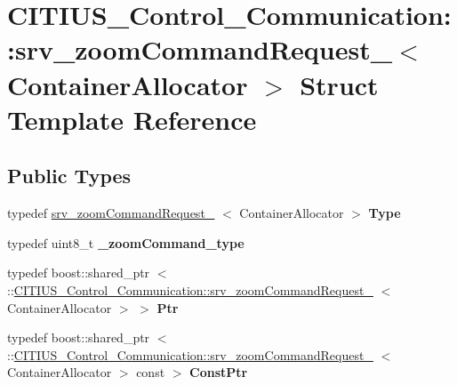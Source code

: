 \hypertarget{struct_c_i_t_i_u_s___control___communication_1_1srv__zoom_command_request__}{\section{\-C\-I\-T\-I\-U\-S\-\_\-\-Control\-\_\-\-Communication\-:\-:srv\-\_\-zoom\-Command\-Request\-\_\-$<$ \-Container\-Allocator $>$ \-Struct \-Template \-Reference}
\label{struct_c_i_t_i_u_s___control___communication_1_1srv__zoom_command_request__}
}
\subsection*{\-Public \-Types}
\begin{DoxyCompactItemize}
\item 
\hypertarget{struct_c_i_t_i_u_s___control___communication_1_1srv__zoom_command_request___a566a130cc023cd323ae48b9c8cd036e5}{typedef \*
\hyperlink{struct_c_i_t_i_u_s___control___communication_1_1srv__zoom_command_request__}{srv\-\_\-zoom\-Command\-Request\-\_\-}\*
$<$ \-Container\-Allocator $>$ {\bfseries \-Type}}\label{struct_c_i_t_i_u_s___control___communication_1_1srv__zoom_command_request___a566a130cc023cd323ae48b9c8cd036e5}

\item 
\hypertarget{struct_c_i_t_i_u_s___control___communication_1_1srv__zoom_command_request___a842fe15775df62a91efecc940536f64a}{typedef uint8\-\_\-t {\bfseries \-\_\-zoom\-Command\-\_\-type}}\label{struct_c_i_t_i_u_s___control___communication_1_1srv__zoom_command_request___a842fe15775df62a91efecc940536f64a}

\item 
\hypertarget{struct_c_i_t_i_u_s___control___communication_1_1srv__zoom_command_request___ac1a59b646c2a94d675261e3c1b28dc7f}{typedef boost\-::shared\-\_\-ptr\*
$<$ \-::\hyperlink{struct_c_i_t_i_u_s___control___communication_1_1srv__zoom_command_request__}{\-C\-I\-T\-I\-U\-S\-\_\-\-Control\-\_\-\-Communication\-::srv\-\_\-zoom\-Command\-Request\-\_\-}\*
$<$ \-Container\-Allocator $>$ $>$ {\bfseries \-Ptr}}\label{struct_c_i_t_i_u_s___control___communication_1_1srv__zoom_command_request___ac1a59b646c2a94d675261e3c1b28dc7f}

\item 
\hypertarget{struct_c_i_t_i_u_s___control___communication_1_1srv__zoom_command_request___a84ecc80690997b26e62fb2424d94b696}{typedef boost\-::shared\-\_\-ptr\*
$<$ \-::\hyperlink{struct_c_i_t_i_u_s___control___communication_1_1srv__zoom_command_request__}{\-C\-I\-T\-I\-U\-S\-\_\-\-Control\-\_\-\-Communication\-::srv\-\_\-zoom\-Command\-Request\-\_\-}\*
$<$ \-Container\-Allocator $>$ const  $>$ {\bfseries \-Const\-Ptr}}\label{struct_c_i_t_i_u_s___control___communication_1_1srv__zoom_command_request___a84ecc80690997b26e62fb2424d94b696}

\end{DoxyCompactItemize}
